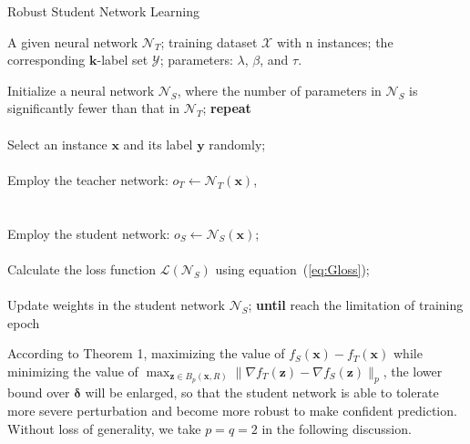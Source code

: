 \documentclass[journal]{IEEEtran}
\newcommand{\Eref}[1]{equation~(\ref{#1})}
\newcommand{\bx}{\bm{x}}
\newcommand{\bz}{\bm{z}}
\newcommand{\bdelta}{\bm{\delta}}
\begin{document}
  \renewcommand{\algorithmicrequire}{\textbf{Input:}}
  \renewcommand{\algorithmicensure}{\textbf{Output:}}
  \begin{algorithm}
  \caption{Robust Student Network Learning}
  \label{alg:classifier}
  \begin{algorithmic}[1]
  \REQUIRE A given neural network $\mathcal N_T$; training dataset $\mathcal X$ with n instances; the corresponding $\bm k$-label set $\mathcal Y$; parameters: $\lambda$, $\beta$, and $\tau$.
  
  \STATE
  Initialize a neural network $\mathcal N_S$, where the number of parameters in $\mathcal N_S$ is significantly fewer than that in $\mathcal N_T$; 
  \STATE
  \textbf{repeat}
  \STATE
  \\\\Select an instance $\bm x$ and its label $\bm y$ randomly;
  \STATE
  \\\\Employ the teacher network: $o_T \leftarrow \mathcal N_T(\bm x)$,\\ 
  \STATE
  \\\\Employ the student network: $o_S \leftarrow \mathcal N_S(\bm x)$;
  \STATE
  \\\\Calculate the loss function $\mathcal L(\mathcal N_S)$ using \Eref{eq:Gloss};
  \STATE
  \\\\Update weights in the student network $\mathcal N_S$;
  \STATE
  \textbf{until} reach the limitation of training epoch
  \end{algorithmic}
  \end{algorithm}



According to Theorem 1, maximizing the value of $f_S(\bx) - f_T(\bx)$  while minimizing the value of $\max_{\bz\in B_p(\bx,R)}\|\nabla f_T(\bz)-\nabla f_S(\bz)\|_p$, the lower bound over $\bdelta$ will be enlarged, so that the student network is able to tolerate more severe perturbation and become more robust to make confident prediction. Without loss of generality, we take $p=q=2$ in the following discussion.
\end{document}
